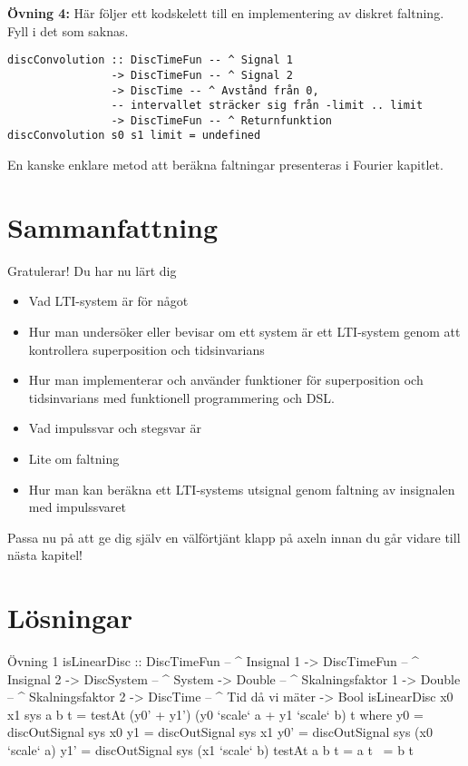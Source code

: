 \documentclass{article}
\begin{document}
\textbf{Övning 4:}
Här följer ett kodskelett till en implementering av diskret faltning. Fyll i det som saknas.
\begin{verbatim}
discConvolution :: DiscTimeFun -- ^ Signal 1
                -> DiscTimeFun -- ^ Signal 2
                -> DiscTime -- ^ Avstånd från 0,
                -- intervallet sträcker sig från -limit .. limit
                -> DiscTimeFun -- ^ Returnfunktion
discConvolution s0 s1 limit = undefined
\end{verbatim}
En kanske enklare metod att beräkna faltningar presenteras i Fourier kapitlet.
\newpage

\section{Sammanfattning}
Gratulerar! Du har nu lärt dig
\begin{itemize}
\item Vad LTI-system är för något
\item Hur man undersöker eller bevisar om ett system är ett LTI-system genom att kontrollera superposition och tidsinvarians
\item Hur man implementerar och använder funktioner för superposition och tidsinvarians med funktionell programmering och DSL.
\item Vad impulssvar och stegsvar är
\item Lite om faltning
\item Hur man kan beräkna ett LTI-systems utsignal genom faltning av insignalen med impulssvaret
\end{itemize}
Passa nu på att ge dig själv en välförtjänt klapp på axeln innan du går vidare till nästa kapitel!


\section{Lösningar}

Övning 1
isLinearDisc :: DiscTimeFun -- ^ Insignal 1
            -> DiscTimeFun -- ^ Insignal 2
            -> DiscSystem  -- ^ System
            -> Double -- ^ Skalningsfaktor 1
            -> Double -- ^ Skalningsfaktor 2
            -> DiscTime -- ^ Tid då vi mäter
            -> Bool
isLinearDisc x0 x1 sys a b t = testAt (y0' + y1') (y0 `scale` a + y1 `scale` b) t
    where y0  = discOutSignal sys x0
          y1  = discOutSignal sys x1
          y0' = discOutSignal sys (x0 `scale` a)
          y1' = discOutSignal sys (x1 `scale` b)
          testAt a b t = a t ~= b t
\end{document}
